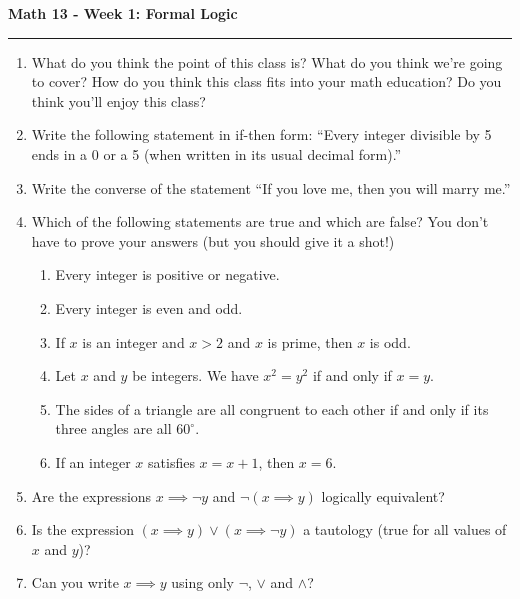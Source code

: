 \documentclass[12pt]{article}
\begin{document}
\begin{center}
{\bf \Large Math 13 - Week 1: Formal Logic}
\vspace{0.2cm}
\hrule
\end{center}

\begin{enumerate}
	\item What do you think the point of this class is? What do you think we're going to cover? How do you think this class fits into your math education? Do you think you'll enjoy this class?

	\vfill

	\item Write the following statement in if-then form: ``Every integer divisible by 5 ends in a 0 or a 5 (when written in its usual decimal form).''

	\vfill

	\item Write the converse of the statement ``If you love me, then you will marry me.''

	\vfill

	\item Which of the following statements are true and which are false? You don't have to prove your answers (but you should give it a shot!)
	\begin{enumerate}
		\item Every integer is positive or negative.
		\item Every integer is even and odd.
		\item If $x$ is an integer and $x>2$ and $x$ is prime, then $x$ is odd.
		\item Let $x$ and $y$ be integers. We have $x^2 = y^2$ if and only if $x=y$.
		\item The sides of a triangle are all congruent to each other if and only if its three angles are all $60^\circ$.
		\item If an integer $x$ satisfies $x = x+1$, then $x=6$.
	\end{enumerate}

	\vfill

	\item Are the expressions $x\implies \neg y$ and $\neg (x\implies y)$ logically equivalent?

	\vfill

	\item Is the expression $(x\implies y)\lor (x\implies \neg y)$ a tautology (true for all values of $x$ and $y$)?
	\vfill

	\item Can you write $x\implies y$ using only $\neg$, $\lor$ and $\land$?
	\vfill
\end{enumerate}
\end{document}
